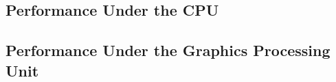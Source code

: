 \documentclass[]{article}
\begin{document}

\subsection{Performance Under the CPU} %
\label{sub:performance_under_the_cpu}


\subsection{Performance Under the Graphics Processing Unit} %
\label{sub:performance_under_the_graphics_processing_unit}





\end{document}
